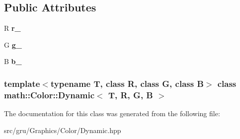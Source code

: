 \subsection*{\-Public \-Attributes}
\begin{DoxyCompactItemize}
\item 
\hypertarget{classmath_1_1Color_1_1Dynamic_acff65527ca36b495e192595d4b497498}{\-R {\bfseries r\-\_\-}}\label{classmath_1_1Color_1_1Dynamic_acff65527ca36b495e192595d4b497498}

\item 
\hypertarget{classmath_1_1Color_1_1Dynamic_a53fcc569fd402f76d834369dc011aaa3}{\-G {\bfseries g\-\_\-}}\label{classmath_1_1Color_1_1Dynamic_a53fcc569fd402f76d834369dc011aaa3}

\item 
\hypertarget{classmath_1_1Color_1_1Dynamic_ad6f2a9af60170e9f690fdb447b377027}{\-B {\bfseries b\-\_\-}}\label{classmath_1_1Color_1_1Dynamic_ad6f2a9af60170e9f690fdb447b377027}

\end{DoxyCompactItemize}
\subsubsection*{template$<$typename T, class R, class G, class B$>$ class math\-::\-Color\-::\-Dynamic$<$ T, R, G, B $>$}



\-The documentation for this class was generated from the following file\-:\begin{DoxyCompactItemize}
\item 
src/gru/\-Graphics/\-Color/\-Dynamic.\-hpp\end{DoxyCompactItemize}
